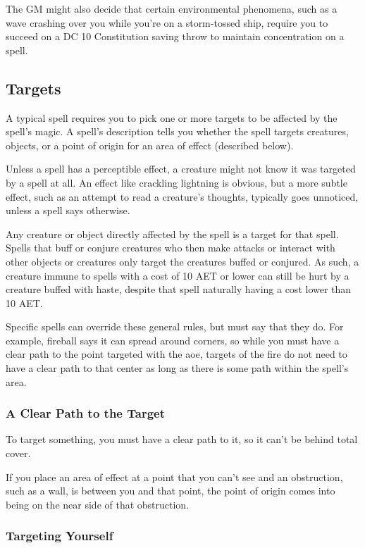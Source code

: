 The GM might also decide that certain environmental phenomena, such as a wave crashing over you while you're on a storm-tossed ship, require you to succeed on a DC 10 Constitution saving throw to maintain concentration on a spell.

\subsection{Targets}

A typical spell requires you to pick one or more targets to be affected by the spell's magic. A spell's description tells you whether the spell targets creatures, objects, or a point of origin for an area of effect (described below).

Unless a spell has a perceptible effect, a creature might not know it was targeted by a spell at all. An effect like crackling lightning is obvious, but a more subtle effect, such as an attempt to read a creature's thoughts, typically goes unnoticed, unless a spell says otherwise.

Any creature or object directly affected by the spell is a target for that spell. Spells that buff or conjure creatures who then make attacks or interact with other objects or creatures only target the creatures buffed or conjured. As such, a creature immune to spells with a cost of 10 AET or lower can still be hurt by a creature buffed with haste, despite that spell naturally having a cost lower than 10 AET.

Specific spells can override these general rules, but must say that they do. For example, fireball says it can spread around corners, so while you must have a clear path to the point targeted with the aoe, targets of the fire do not need to have a clear path to that center as long as there is some path within the spell's area.

\subsubsection{A Clear Path to the Target}

To target something, you must have a clear path to it, so it can't be behind total cover.

If you place an area of effect at a point that you can't see and an obstruction, such as a wall, is between you and that point, the point of origin comes into being on the near side of that obstruction.

\subsubsection{Targeting Yourself}

